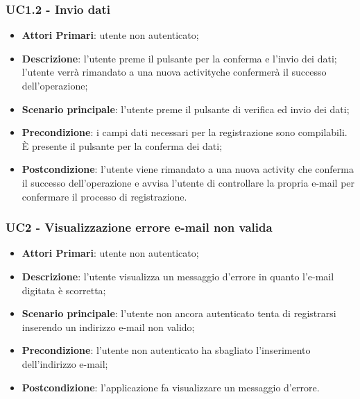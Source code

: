 \subsubsection{UC1.2 - Invio dati}
\begin{itemize}
	\item \textbf{Attori Primari}: utente non autenticato;
	\item \textbf{Descrizione}: l'utente preme il pulsante per la conferma e l'invio dei dati; l'utente verrà rimandato a una nuova activity\glosp che confermerà il successo dell'operazione;
	\item \textbf{Scenario principale}: l'utente preme il pulsante di verifica ed invio dei dati;	
	\item \textbf{Precondizione}: i campi dati necessari per la registrazione sono compilabili. È presente il pulsante per la conferma dei dati;
	\item \textbf{Postcondizione}: l'utente viene rimandato a una nuova activity che conferma il successo dell'operazione e avvisa l'utente di controllare la propria e-mail per confermare il processo di registrazione.
\end{itemize}

\subsubsection{UC2 - Visualizzazione errore e-mail non valida}
\begin{itemize}
	\item \textbf{Attori Primari}: utente non autenticato;
	\item \textbf{Descrizione}: l'utente visualizza un messaggio d'errore in quanto l'e-mail digitata è scorretta;
	\item \textbf{Scenario principale}: l'utente non ancora autenticato tenta di registrarsi inserendo un indirizzo e-mail non valido;
	\item \textbf{Precondizione}: l'utente non autenticato ha sbagliato l'inserimento dell'indirizzo e-mail; 
	\item \textbf{Postcondizione}: l'applicazione fa visualizzare un messaggio d'errore.
\end{itemize}

